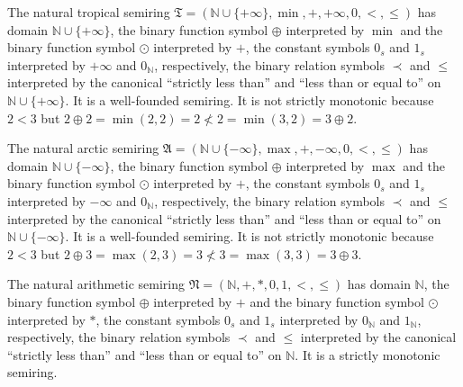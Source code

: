 \begin{example}
    The natural tropical semiring $\mathfrak{T} = (\mathbb{N} \cup \{+\infty\},\min,+,+\infty, 0, <, \leq)$ has domain $\mathbb{N} \cup \{+\infty\}$, the binary function symbol $\oplus$ interpreted by $\min$ and the binary function symbol $\odot$ interpreted by $+$, the constant symbols $0_s$ and $1_s$ interpreted by $+\infty$ and $0_\mathbb{N}$, respectively, the binary relation symbols $\prec$ and $\leq$ interpreted by the canonical \enquote{strictly less than} and \enquote{less than or equal to} on $\mathbb{N} \cup \{+\infty\}$. It is a well-founded semiring. It is not strictly monotonic because $2 < 3$ but $2 \oplus 2 = \min(2,2) = 2 \not < 2 = \min(3,2) = 3 \oplus 2$.
\end{example}
    
\begin{example}
    The natural arctic semiring $\mathfrak{A} = (\mathbb{N} \cup \{-\infty\},\max,+,-\infty, 0,<,\leq)$ has domain $\mathbb{N} \cup \{-\infty\}$, the binary function symbol $\oplus$ interpreted by $\max$ and the binary function symbol $\odot$ interpreted by $+$, the constant symbols $0_s$ and $1_s$ interpreted by $-\infty$ and $0_\mathbb{N}$, respectively, the binary relation symbols $\prec$ and $\leq$ interpreted by the canonical \enquote{strictly less than} and \enquote{less than or equal to} on $\mathbb{N} \cup \{-\infty\}$. It is a well-founded semiring. It is not strictly monotonic because $2 < 3$ but $2 \oplus 3 = \max(2,3) = 3 \not < 3 = \max(3,3) = 3 \oplus 3$.
\end{example}

\begin{example}
    The natural arithmetic semiring $\mathfrak{N} = (\mathbb{N},+,*,0,1,<,\leq)$ has domain $\mathbb{N}$, the binary function symbol $\oplus$ interpreted by $+$ and the binary function symbol $\odot$ interpreted by $*$, the constant symbols $0_s$ and $1_s$ interpreted by $0_\mathbb{N}$ and $1_\mathbb{N}$, respectively, the binary relation symbols $\prec$ and $\leq$ interpreted by the canonical \enquote{strictly less than} and \enquote{less than or equal to} on $\mathbb{N}$. It is a strictly monotonic semiring.
\end{example}

